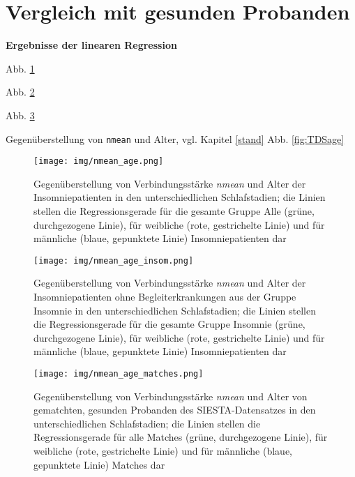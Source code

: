 \section{Vergleich mit gesunden Probanden}


\textbf{Ergebnisse der linearen Regression}

Abb. \ref{fig:nmean_age}

Abb. \ref{fig:nmean_age_insom}

Abb. \ref{fig:nmean_age_matches}

Gegenüberstellung von \texttt{nmean} und Alter, vgl. Kapitel \ref{stand} Abb. \ref{fig:TDSage}


\begin{figure}[H]
	\centering
	\texttt{[image: img/nmean\_age.png]}
	\caption[Gegenüberstellung von Verbindungsstärke \textit{nmean} und Alter von Insomniepatienten]{Gegenüberstellung von Verbindungsstärke \textit{nmean} und Alter der Insomniepatienten in den unterschiedlichen Schlafstadien; die Linien stellen die Regressionsgerade für die gesamte Gruppe Alle (grüne, durchgezogene Linie), für weibliche (rote, gestrichelte Linie) und für männliche (blaue, gepunktete Linie) Insomniepatienten dar}
	\label{fig:nmean_age}
\end{figure}



\begin{figure}[H]
	\centering
	\texttt{[image: img/nmean\_age\_insom.png]}
	\caption[Gegenüberstellung von Verbindungsstärke \textit{nmean} und Alter von Insomniepatienten ohne Begleiterkrankungen]{Gegenüberstellung von Verbindungsstärke \textit{nmean} und Alter der Insomniepatienten ohne Begleiterkrankungen aus der Gruppe Insomnie in den unterschiedlichen Schlafstadien; die Linien stellen die Regressionsgerade für die gesamte Gruppe Insomnie (grüne, durchgezogene Linie), für weibliche (rote, gestrichelte Linie) und für männliche (blaue, gepunktete Linie) Insomniepatienten dar}
	\label{fig:nmean_age_insom}
\end{figure}



\begin{figure}[H]
	\centering
	\texttt{[image: img/nmean\_age\_matches.png]}
	\caption[Gegenüberstellung von Verbindungsstärke \textit{nmean} und Alter von gematchten, gesunden Probanden]{Gegenüberstellung von Verbindungsstärke \textit{nmean} und Alter von gematchten, gesunden Probanden des SIESTA-Datensatzes in den unterschiedlichen Schlafstadien; die Linien stellen die Regressionsgerade für alle Matches (grüne, durchgezogene Linie), für weibliche (rote, gestrichelte Linie) und für männliche (blaue, gepunktete Linie) Matches dar}
	\label{fig:nmean_age_matches}
\end{figure}



